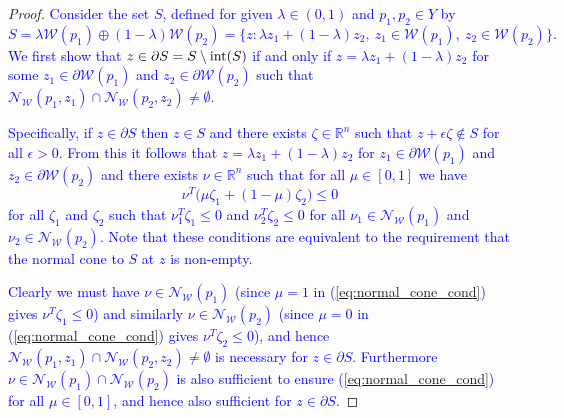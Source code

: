 \documentclass[smallextended]{svjour3}       %
\numberwithin{equation}{section}
\newcommand{\revision}[1]{\textcolor{blue}{#1}}
\begin{document}
%
\begin{proof}
  \revision{Consider the set $S$, defined for given $\lambda\in (0,1)$ and $p_1,p_2\in Y$ by
  \[
    S = \lambda \mathcal{W}(p_1) \oplus (1-\lambda) \mathcal{W}(p_2) 
      = \bigl\{ z : \lambda z_1 + (1 - \lambda) z_2, \ z_1 \in\mathcal W(p_1), \ z_2 \in\mathcal W(p_2) \bigr\} .
  \]
  We first show that $z\in \partial S = S \setminus \textup{int}(S)$ if and only if
  $z = \lambda z_1 + (1 - \lambda) z_2$ for some $z_1\in\partial \mathcal W(p_1)$ and $z_2\in\partial \mathcal W(p_2)$ such that $\mathcal N_{\mathcal W}(p_1,z_1) \cap \mathcal N_{\mathcal W}(p_2,z_2) \neq \emptyset$.}
  
  \revision{Specifically, if $z\in \partial S$ then $z\in S$ and there exists $\zeta\in\mathbb R^n$ such that $z + \epsilon \zeta \notin S$ for all $\epsilon > 0$.
  From this it follows that $z = \lambda z_1 + (1-\lambda ) z_2$ for $z_1\in\partial \mathcal W(p_1)$ and $z_2\in\partial \mathcal W(p_2)$ and there exists $\nu\in \mathbb R^n$ such that for all $\mu \in [0,1]$ we have
  \begin{equation}\label{eq:normal_cone_cond}
    \nu^T \bigl( \mu \zeta_1 + (1-\mu) \zeta_2 \bigr) \leq 0 
  \end{equation}
  for all $\zeta_1$ and $\zeta_2$ such that $\nu_1^T\zeta_1 \leq 0$ and $\nu_2^T\zeta_2 \leq 0$ for all $\nu_1\in\mathcal N_{\mathcal W}(p_1)$ and $\nu_2\in\mathcal N_{\mathcal W}(p_2)$. Note that these conditions are equivalent to the requirement that the normal cone to $S$ at $z$ is non-empty.}

\revision{Clearly we must have $\nu\in \mathcal N_{\mathcal W}(p_1)$ (since $\mu = 1$ in (\ref{eq:normal_cone_cond}) gives $\nu^T\zeta_1 \leq 0$) and similarly $\nu\in \mathcal N_{\mathcal W}(p_2)$ (since $\mu = 0$ in (\ref{eq:normal_cone_cond}) gives $\nu^T\zeta_2 \leq 0$), and hence $\mathcal N_{\mathcal W}(p_1,z_1) \cap \mathcal N_{\mathcal W}(p_2,z_2) \neq \emptyset$ is necessary for $z\in\partial S$.
  Furthermore $\nu\in \mathcal N_{\mathcal W}(p_1)\cap \mathcal N_{\mathcal W}(p_2)$ is also sufficient to ensure (\ref{eq:normal_cone_cond}) for all $\mu\in[0,1]$, and hence also sufficient for $z\in\partial S$.}


\end{proof}
\end{document}
